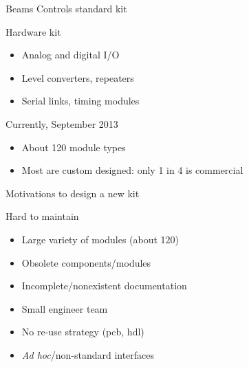\documentclass[compress,red]{beamer}
\begin{document}
\begin{frame}{Beams Controls standard kit}

  \begin{block}{Hardware kit}
    \begin{itemize}
    \item Analog and digital I/O
    \item Level converters, repeaters
    \item Serial links, timing modules
    \end{itemize}
  \end{block}

  \begin{block}{Currently, September 2013}
    \begin{itemize}
    \item About 120 module types %
    \item Most are custom designed: only 1 in 4 is commercial
    \end{itemize}
  \end{block}

\end{frame}

\begin{frame}{Motivations to design a new kit}


  \begin{block}{Hard to maintain}
    \begin{itemize}
    \item Large variety of modules (about 120)
    \item Obsolete components/modules
    \item Incomplete/nonexistent documentation
    \item Small engineer team %
    \item No re-use strategy (pcb, hdl)
    \item \textit{Ad hoc}/non-standard interfaces %
    \end{itemize}
  \end{block}

\end{frame}
\end{document}

